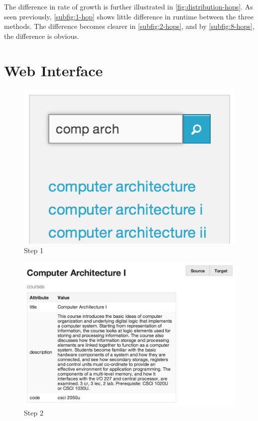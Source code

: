 				
				The difference in rate of growth is further illustrated in \cref{fig:distribution-hops}.  As seen previously, \cref{subfig:1-hop} shows little difference in runtime between the three methods.  The difference becomes clearer in \cref{subfig:2-hops}, and by \cref{subfig:8-hops}, the difference is obvious.
	
	\section{Web Interface}
	\label{sec:web-interface}
		\begin{figure}[H]
			\centering
			\includegraphics[scale=0.5]{figures/images/step-1}
			
			\caption{Step 1}
			\label{fig:webui-step-1}
		\end{figure}
		
		\begin{figure}[H]
			\centering
			\includegraphics[scale=0.5]{figures/images/step-2}
			
			\caption{Step 2}
			\label{fig:webui-step-2}
		\end{figure}
		
